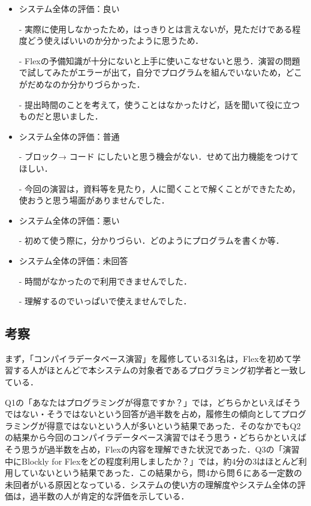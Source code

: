 \documentclass{risepaper}
\begin{document}
\begin{itemize}
\item システム全体の評価：良い

- 実際に使用しなかったため，はっきりとは言えないが，見ただけである程度どう使えばいいのか分かったように思うため．

- Flexの予備知識が十分にないと上手に使いこなせないと思う．演習の問題で試してみたがエラーが出て，自分でプログラムを組んでいないため，どこがだめなのか分かりづらかった．

- 提出時間のことを考えて，使うことはなかったけど，話を聞いて役に立つものだと思いました．

\item システム全体の評価：普通

- ブロック→ コード にしたいと思う機会がない．せめて出力機能をつけてほしい．

- 今回の演習は，資料等を見たり，人に聞くことで解くことができたため，使おうと思う場面がありませんでした．

\item システム全体の評価：悪い

- 初めて使う際に，分かりづらい．どのようにプログラムを書くか等．

\item システム全体の評価：未回答

- 時間がなかったので利用できませんでした．

- 理解するのでいっぱいで使えませんでした．

\end{itemize} 

        \subsection{考察}

まず，「コンパイラデータベース演習」を履修している31名は，Flexを初めて学習する人がほとんどで本システムの対象者であるプログラミング初学者と一致している．


Q1の「あなたはプログラミングが得意ですか？」では，どちらかといえばそうではない・そうではないという回答が過半数を占め，履修生の傾向としてプログラミングが得意ではないという人が多いという結果であった．そのなかでもQ2の結果から今回のコンパイラデータベース演習ではそう思う・どちらかといえばそう思うが過半数を占め，Flexの内容を理解できた状況であった．Q3の「演習中にBlockly for Flexをどの程度利用しましたか？」では，約4分の3はほとんど利用していないという結果であった．この結果から，問4から問６にある一定数の未回者がいる原因となっている．システムの使い方の理解度やシステム全体の評価は，過半数の人が肯定的な評価を示している．
\end{document}
